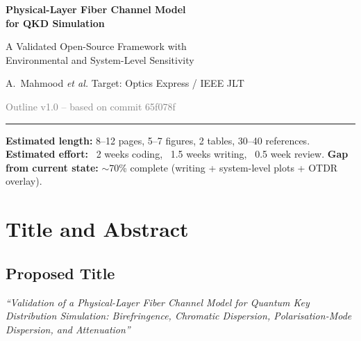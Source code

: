 \documentclass[11pt,a4paper]{article}
\begin{document}
\begin{center}
  {\Huge\bfseries Physical-Layer Fiber Channel Model\\for QKD Simulation\par}
  \vspace{0.5em}
  {\large A Validated Open-Source Framework with\\Environmental and System-Level Sensitivity\par}
  \vspace{0.3em}
  {\normalsize A.~Mahmood \textit{et al.} \hfill Target: Optics Express / IEEE JLT\par}
  \vspace{0.2em}
  {\small \textcolor{gray}{Outline v1.0 -- based on commit 65f078f}}
\end{center}

\vspace{0.5em}
\rule{\textwidth}{1pt}
\vspace{0.5em}

\noindent\textbf{Estimated length:} 8--12 pages, 5--7 figures, 2 tables, 30--40 references.
\textbf{Estimated effort:} ~2 weeks coding, ~1.5 weeks writing, ~0.5 week review.
\textbf{Gap from current state:} $\sim$70\% complete (writing + system-level plots + OTDR overlay).

\section{Title and Abstract}

\subsection{Proposed Title}
\textit{``Validation of a Physical-Layer Fiber Channel Model for Quantum Key Distribution Simulation: Birefringence, Chromatic Dispersion, Polarisation-Mode Dispersion, and Attenuation''}
\end{document}
